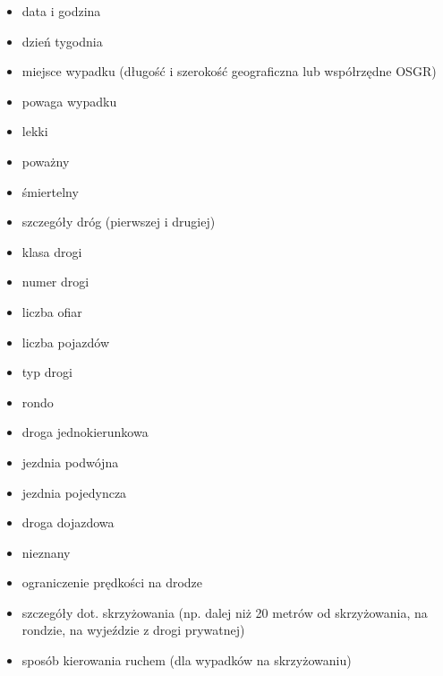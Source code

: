 \begin{itemize}
\itemsep-14pt\parskip0pt
\item
  data i godzina\\
\item
  dzień tygodnia\\
\item
  miejsce wypadku (długość i szerokość geograficzna lub współrzędne
  OSGR)\\
\item
  powaga wypadku\\
\item
  lekki\\
\item
  poważny\\
\item
  śmiertelny\\
\item
  szczegóły dróg (pierwszej i drugiej)\\
\item
  klasa drogi\\
\item
  numer drogi\\
\item
  liczba ofiar\\
\item
  liczba pojazdów\\
\item
  typ drogi\\
\item
  rondo\\
\item
  droga jednokierunkowa\\
\item
  jezdnia podwójna\\
\item
  jezdnia pojedyncza\\
\item
  droga dojazdowa\\
\item
  nieznany\\
\item
  ograniczenie prędkości na drodze\\
\item
  szczegóły dot. skrzyżowania (np. dalej niż 20 metrów od skrzyżowania,
  na rondzie, na wyjeździe z drogi prywatnej)\\
\item
  sposób kierowania ruchem (dla wypadków na skrzyżowaniu)\\

\end{itemize}

